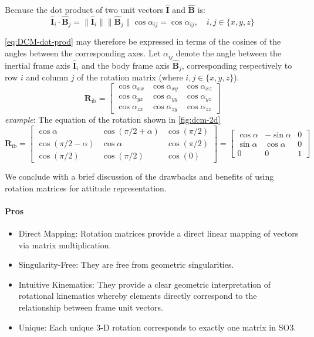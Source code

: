 Because the dot product of two unit vectors \(\hat{\mathbf{I}}\) and \(\hat{\mathbf{B}}\) is:
\begin{equation}
    \hat{\mathbf{I}}_i \cdot \hat{\mathbf{B}}_j = \|\hat{\mathbf{I}}_i\| \|\hat{\mathbf{B}}_j\| \cos\alpha_{ij} = \cos\alpha_{ij}, \quad i,j \in \{x,y,z\}
\label{eq:dot-product-definition}
\end{equation}

\cref{eq:DCM-dot-prod} may therefore be expressed in terms of the cosines of the angles between the corresponding axes.
Let \(\alpha_{ij}\) denote the angle between the inertial frame axis \(\hat{\mathbf{I}}_i\) and the body frame axis \(\hat{\mathbf{B}}_j\), 
corresponding respectively to row \(i\) and column \(j\) of the rotation matrix (where \(i,j \in \{x,y,z\} \)).
\begin{equation}
    \mathbf{R}_{\text{ib}} = 
    \begin{bmatrix}
        \cos\alpha_{xx} & \cos\alpha_{xy} & \cos\alpha_{xz} \\
        \cos\alpha_{yx} & \cos\alpha_{yy} & \cos\alpha_{yz} \\
        \cos\alpha_{zx} & \cos\alpha_{zy} & \cos\alpha_{zz}
    \end{bmatrix}
\label{eq:DCM-cos-alpha}
\end{equation}
\emph{example}: The equation of the rotation shown in \cref{fig:dcm-2d}
\begin{equation}
    \mathbf{R}_{\text{ib}} = 
    \begin{bmatrix}
        \cos\alpha & \cos(\pi/2+\alpha) & \cos(\pi/2) \\
        \cos(\pi/2-\alpha) & \cos\alpha & \cos(\pi/2) \\
        \cos(\pi/2) & \cos(\pi/2) & \cos(0)
    \end{bmatrix}
    =
    \begin{bmatrix}
        \cos\alpha & -\sin\alpha & 0 \\
        \sin\alpha & \cos\alpha & 0 \\
        0 & 0 & 1
    \end{bmatrix}
\end{equation}

We conclude with a brief discussion of the drawbacks and benefits of using rotation matrices for attitude representation.

\paragraph{Pros}
\begin{itemize}
    \item Direct Mapping: Rotation matrices provide a direct linear mapping of vectors via matrix multiplication.
    \item Singularity-Free: They are free from geometric singularities.
    \item Intuitive Kinematics: They provide a clear geometric interpretation of rotational kinematics whereby elements directly correspond to the relationship between frame unit vectors.
    \item Unique: Each unique \ac{3-D} rotation corresponds to exactly one matrix in \ac{SO3}.
\end{itemize}

